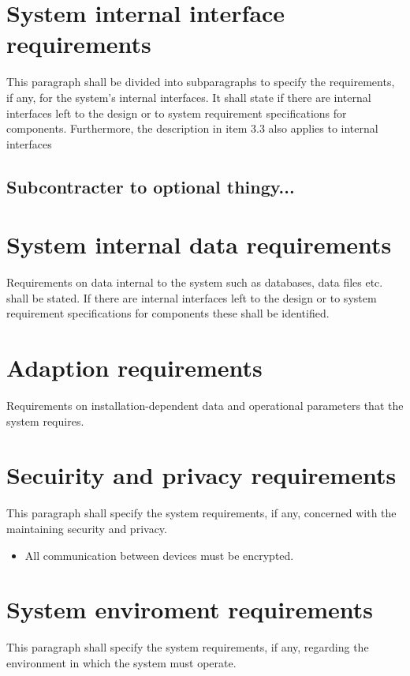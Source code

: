\section{System internal interface requirements}
This paragraph shall be divided into subparagraphs to specify the requirements, if any, for the system’s internal interfaces. It shall state if there are internal interfaces left to the design or to system requirement specifications for components. Furthermore, the description in item 3.3 also applies to internal interfaces

\subsection{Subcontracter to optional thingy...}

\section{System internal data requirements}
Requirements on data internal to the system such as databases, data files etc. shall be stated. If there are internal interfaces left to the design or to system requirement specifications for components these shall be identified.

\section{Adaption requirements}
Requirements on installation-dependent data and operational parameters that the system requires.


\section{Secuirity and privacy requirements}
This paragraph shall specify the system requirements, if any, concerned with the maintaining security and privacy.

\begin{itemize}
	\item All communication between devices must be encrypted.
\end{itemize}

\section{System enviroment requirements}
This paragraph shall specify the system requirements, if any, regarding the environment in which the system must operate.


